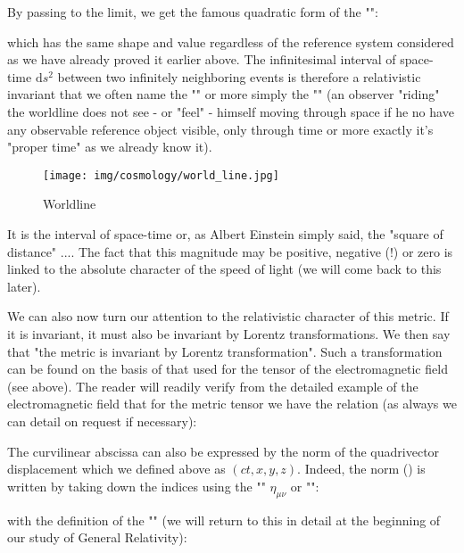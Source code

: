 	By passing to the limit, we get the famous quadratic form of the "\label{interval invariant}":
	
	which has the same shape and value regardless of the reference system considered as we have already proved it earlier above. The infinitesimal interval of space-time $\mathrm{d}s^2$ between two infinitely neighboring events is therefore a relativistic invariant that we often name the "" or more simply the "" (an observer "riding" the worldline does not see - or "feel" - himself moving through space if he no have any observable reference object visible, only through time or more exactly it's "proper time" as we already know it). 
	\begin{figure}[H]
		\centering
		\texttt{[image: img/cosmology/world\_line.jpg]}
		\caption{Worldline}	
	\end{figure}
	It is the interval of space-time or, as Albert Einstein simply said, the "square of distance" .... The fact that this magnitude may be positive, negative (!) or zero is linked to the absolute character of the speed of light (we will come back to this later).

	We can also now turn our attention to the relativistic character of this metric. If it is invariant, it must also be invariant by Lorentz transformations. We then say that "the metric is invariant by Lorentz transformation". Such a transformation can be found on the basis of that used for the tensor of the electromagnetic field (see above). The reader will readily verify from the detailed example of the electromagnetic field that for the metric tensor we have the relation (as always we can detail on request if necessary):
	
	The curvilinear abscissa can also be expressed by the norm of the quadrivector displacement which we defined above as $(ct,x,y,z)$. Indeed, the norm () is written by taking down the indices using the "\label{minkowski metric}" $\eta_{\mu\nu}$ or "":
	
	with the definition of the "" (we will return to this in detail at the beginning of our study of General Relativity):
	

